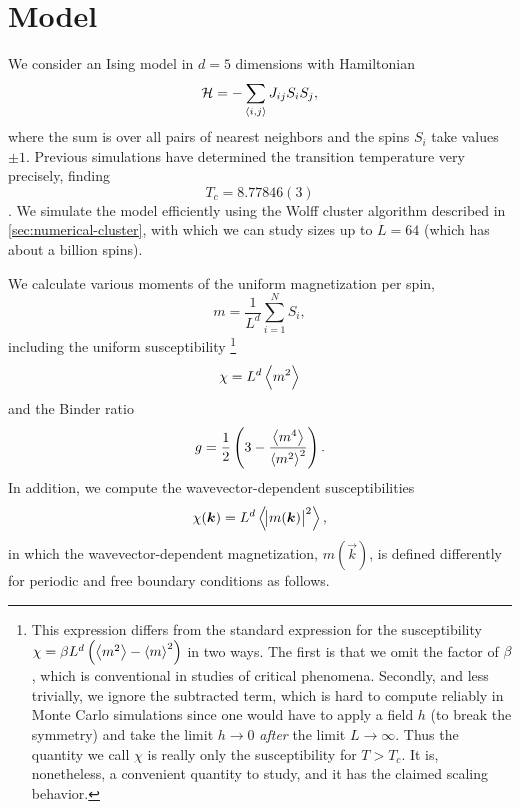 
\section{Model}
\label{sec:fss-model}

We consider an Ising model in $d=5$ dimensions with Hamiltonian
\begin{equation}
  \mathcal{H} = -\sum_{\langle i,j \rangle} J_{ij} S_i S_j,
\end{equation}
where the sum is over all pairs of nearest neighbors and the spins $S_i$ take
values $\pm 1$.
Previous simulations have determined the transition temperature very precisely,
finding
\begin{equation}
  T_c = 8.77846(3)
  \label{eq:Tc-d5}
\end{equation}
\autocite{luijten1999finite}. We simulate the model efficiently using the Wolff
cluster algorithm described in \cref{sec:numerical-cluster}, with which we can
study sizes up to $L=64$ (which has about a billion spins).

We calculate various moments of the uniform magnetization per spin,
\begin{equation}
  m = \frac{1}{L^d} \sum_{i=1}^N S_i,
  \label{eq:mag-k0}
\end{equation}
including the uniform susceptibility%
\footnote{%
  This expression differs from the standard expression for the susceptibility
  $\chi=\beta L^d \left(\left< m^2 \right>-\left< m \right>^2\right)$ in two ways. The first is that we
  omit the factor of $\beta$, which is conventional in studies of critical
  phenomena. Secondly, and less trivially, we ignore the subtracted term, which
  is hard to compute reliably in Monte Carlo simulations since one would have
  to apply a field $h$ (to break the symmetry) and take the limit $h \to 0$
  \emph{after} the limit $L\to\infty$. Thus the quantity we call $\chi$ is
  really only the susceptibility for $T>T_c$. It is, nonetheless, a convenient
  quantity to study, and it has the claimed scaling behavior.
}
\begin{equation}
  \chi = L^d \left< m^2 \right>
  \label{eq:susc-k0}
\end{equation}
and the Binder ratio
\begin{equation}
  g = \frac{1}{2}\left(3 - \frac{\left< m^4 \right>}{\left< m^2 \right>^2}\right).
  \label{eq:binder}
\end{equation}
In addition, we compute the wavevector-dependent susceptibilities
\begin{equation}
  \chi(\bm{k}) = L^d \left< \abs{m(\bm{k})}^2 \right>,
\end{equation}
in which the wavevector-dependent magnetization, $m(\vec{k})$, is defined
differently for periodic and free boundary conditions as follows.

